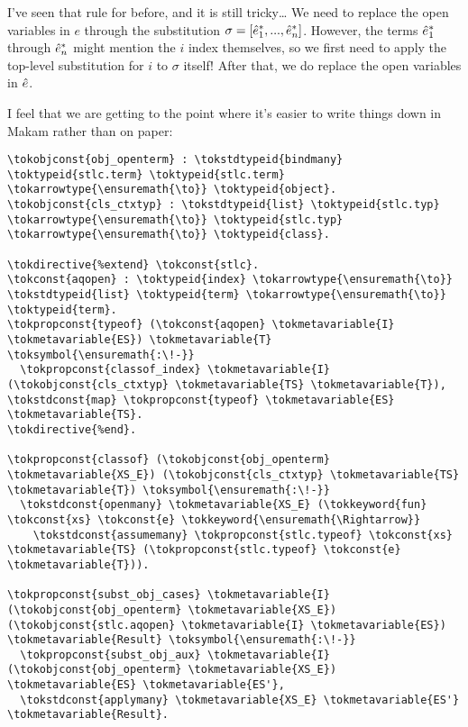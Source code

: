 \heroSTUDENT{} I've seen that rule for  before, and it is
still tricky\ldots{} We need to replace the open variables in \(e\)
through the substitution
\(\sigma = [\hat{e}^*_1, \text{...}, \hat{e}^*_n]\). However, the terms
\(\hat{e}^*_1\) through \(\hat{e}^*_n\) might mention the \(i\) index
themselves, so we first need to apply the top-level substitution for
\(i\) to \(\sigma\) itself! After that, we do replace the open variables
in \(\hat{e}\).

\heroADVISOR{} I feel that we are getting to the point where it's easier to
write things down in Makam rather than on paper:

\begin{verbatim}
\tokobjconst{obj_openterm} : \tokstdtypeid{bindmany} \toktypeid{stlc.term} \toktypeid{stlc.term} \tokarrowtype{\ensuremath{\to}} \toktypeid{object}.
\tokobjconst{cls_ctxtyp} : \tokstdtypeid{list} \toktypeid{stlc.typ} \tokarrowtype{\ensuremath{\to}} \toktypeid{stlc.typ} \tokarrowtype{\ensuremath{\to}} \toktypeid{class}.

\tokdirective{%extend} \tokconst{stlc}.
\tokconst{aqopen} : \toktypeid{index} \tokarrowtype{\ensuremath{\to}} \tokstdtypeid{list} \toktypeid{term} \tokarrowtype{\ensuremath{\to}} \toktypeid{term}.
\tokpropconst{typeof} (\tokconst{aqopen} \tokmetavariable{I} \tokmetavariable{ES}) \tokmetavariable{T} \toksymbol{\ensuremath{:\!-}}
  \tokpropconst{classof_index} \tokmetavariable{I} (\tokobjconst{cls_ctxtyp} \tokmetavariable{TS} \tokmetavariable{T}), \tokstdconst{map} \tokpropconst{typeof} \tokmetavariable{ES} \tokmetavariable{TS}.
\tokdirective{%end}.

\tokpropconst{classof} (\tokobjconst{obj_openterm} \tokmetavariable{XS_E}) (\tokobjconst{cls_ctxtyp} \tokmetavariable{TS} \tokmetavariable{T}) \toksymbol{\ensuremath{:\!-}}
  \tokstdconst{openmany} \tokmetavariable{XS_E} (\tokkeyword{fun} \tokconst{xs} \tokconst{e} \tokkeyword{\ensuremath{\Rightarrow}} 
    \tokstdconst{assumemany} \tokpropconst{stlc.typeof} \tokconst{xs} \tokmetavariable{TS} (\tokpropconst{stlc.typeof} \tokconst{e} \tokmetavariable{T})).

\tokpropconst{subst_obj_cases} \tokmetavariable{I} (\tokobjconst{obj_openterm} \tokmetavariable{XS_E}) (\tokobjconst{stlc.aqopen} \tokmetavariable{I} \tokmetavariable{ES}) \tokmetavariable{Result} \toksymbol{\ensuremath{:\!-}}
  \tokpropconst{subst_obj_aux} \tokmetavariable{I} (\tokobjconst{obj_openterm} \tokmetavariable{XS_E}) \tokmetavariable{ES} \tokmetavariable{ES'},
  \tokstdconst{applymany} \tokmetavariable{XS_E} \tokmetavariable{ES'} \tokmetavariable{Result}.
\end{verbatim}

